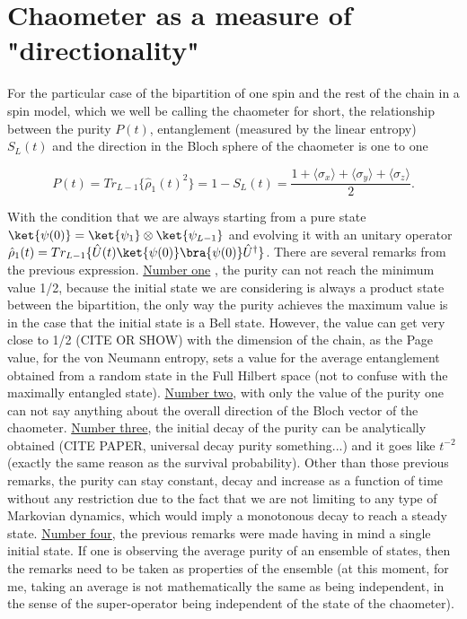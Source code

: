 \section{Chaometer as a measure of "directionality"}

For the particular case of the bipartition of one spin and the rest of the chain in a spin model, which we well be calling the chaometer for short, the relationship between the purity $P(t)$, entanglement (measured by the linear entropy) $S_{L}(t)$ and the direction in the Bloch sphere of the chaometer is one to one

\begin{equation}
    P(t) = Tr_{L-1}\{\hat{\rho}_{1}(t)^2 \} = 1 - S_{L}(t) = \dfrac{1+\langle\sigma_{x}\rangle+\langle\sigma_{y}\rangle+\langle\sigma_{z}\rangle}{2} .
    \label{eq:FUNDAMENTAL}
\end{equation}

With the condition that we are always starting from a pure state $\ket{\psi(0)} = \ket{\psi_{1}}\otimes\ket{\psi_{L-1}}$ and evolving it with an unitary operator $\hat{\rho}_{1}(t) = Tr_{L-1}\{\hat{U}(t)\ket{\psi(0)}\bra{\psi(0)}\hat{U}^{\dagger}\}$. There are several remarks from the previous expression. \underline{Number one} , the purity can not reach the minimum value 1/2, because the initial state we are considering is always a product state between the bipartition, the only way the purity achieves the maximum value is in the case that the initial state is a Bell state. However, the value can get very close to 1/2 (CITE OR SHOW) with the dimension of the chain, as the Page value, for the von Neumann entropy, sets a value for the average entanglement obtained from a random state in the Full Hilbert space (not to confuse with the maximally entangled state). \underline{Number two}, with only the value of the purity one can not say anything about the overall direction of the Bloch vector of the chaometer. \underline{Number three}, the initial decay of the purity can be analytically obtained (CITE PAPER, universal decay purity something...) and it goes like $t^{-2}$ (exactly the same reason as the survival probability). Other than those previous remarks, the purity can stay constant, decay and increase as a function of time without any restriction due to the fact that we are not limiting to any type of Markovian dynamics, which would imply a monotonous decay to reach a steady state. \underline{Number four}, the previous remarks were made having in mind a single initial state. If one is observing the average purity of an ensemble of states, then the remarks need to be taken as properties of the ensemble (at this moment, for me, taking an average is not mathematically the same as being independent, in the sense of the super-operator being independent of the state of the chaometer).

